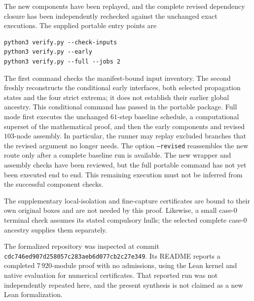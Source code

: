\documentclass[11pt]{article}
\begin{document}
The new components have been replayed, and the complete revised
dependency closure has been independently rechecked against the unchanged
exact executions. The supplied portable entry points are
\begin{verbatim}
python3 verify.py --check-inputs
python3 verify.py --early
python3 verify.py --full --jobs 2
\end{verbatim}
The first command checks the manifest-bound input inventory. The second
freshly reconstructs the conditional early interfaces, both selected
propagation states and the four strict extrema; it does not establish
their earlier global ancestry. This conditional command has passed in
the portable package. Full mode first executes the unchanged $61$-step
baseline schedule, a computational superset of the mathematical proof,
and then the early components and revised $103$-node assembly. In
particular, the runner may replay excluded branches that the revised
argument no longer needs. The option \texttt{--revised} reassembles the
new route only after a complete baseline run is available. The new
wrapper and assembly checks have been reviewed, but the full portable
command has not yet been executed end to end. This remaining execution
must not be inferred from the successful component checks.

The supplementary local-isolation and fine-capture certificates are
bound to their own original boxes and are not needed by this proof.
Likewise, a small case-$0$ terminal check assumes its stated compulsory
hulls; the selected complete case-$0$ ancestry supplies them separately.

The formalized repository was inspected at commit
\texttt{cdc746ed907d258057c283aeb6d077cb2c27e349}.
Its README reports a completed $7\,920$-module proof with no admissions,
using the Lean kernel and native evaluation for numerical certificates.
That reported run was not independently repeated here, and the present
synthesis is not claimed as a new Lean formalization.
\end{document}
